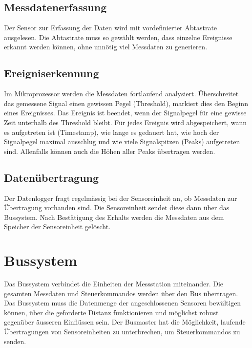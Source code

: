 \subsection{Messdatenerfassung}
Der Sensor zur Erfassung der Daten wird mit vordefinierter Abtastrate ausgelesen. Die Abtastrate muss so gewählt werden, dass einzelne Ereignisse erkannt werden können, ohne unnötig viel Messdaten zu generieren.

\subsection{Ereigniserkennung}
Im Mikroprozessor werden die Messdaten fortlaufend analysiert. Überschreitet das gemessene Signal einen gewissen Pegel (Threshold), markiert dies den Beginn eines Ereignisses. Das Ereignis ist beendet, wenn der Signalpegel für eine gewisse Zeit unterhalb des Threshold bleibt. Für jedes Ereignis wird abgespeichert, wann es aufgetreten ist (Timestamp), wie lange es gedauert hat, wie hoch der Signalpegel maximal ausschlug und wie viele Signalspitzen (Peaks) aufgetreten sind. Allenfalls können auch die Höhen aller Peaks übertragen werden.

\subsection{Datenübertragung}
Der Datenlogger fragt regelmässig bei der Sensoreinheit an, ob Messdaten zur Übertragung vorhanden sind. Die Sensoreinheit sendet diese dann über das Bussystem. Nach Bestätigung des Erhalts werden die Messdaten aus dem Speicher der Sensoreinheit gelöscht.

\section{Bussystem}
Das Bussystem verbindet die Einheiten der Messstation miteinander. Die gesamten Messdaten und Steuerkommandos werden über den Bus übertragen. Das Bussystem muss die Datenmenge der angeschlossenen Sensoren bewältigen können, über die geforderte Distanz funktionieren und möglichst robust gegenüber äusseren Einflüssen sein. Der Busmaster hat die Möglichkeit, laufende Übertragungen von Sensoreinheiten zu unterbrechen, um Steuerkommandos zu senden.
